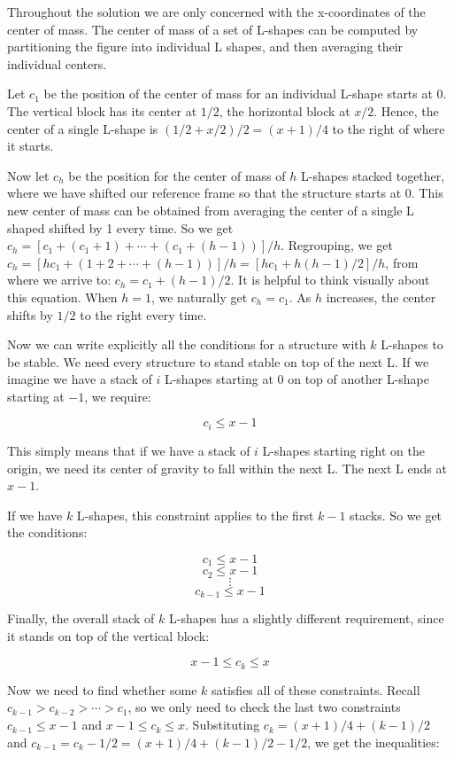 \documentclass[12pt]{article}
\begin{document}
{Throughout the solution we are only concerned with the x-coordinates of the center of mass. The center of mass of a set of L-shapes can be computed by partitioning the figure into individual L shapes, and then averaging their individual centers. 

Let $c_1$ be the position of the center of mass for an individual L-shape starts at $0$. The vertical block has its center at $1/2$, the horizontal block at $x/2$. Hence, the center of a single L-shape is $(1/2 + x/2)/2 = (x + 1)/4$ to the right of where it starts.

Now let $c_h$ be the position for the center of mass of $h$ L-shapes stacked together, where we have shifted our reference frame so that the structure starts at $0$. This new center of mass can be obtained from averaging the center of a single L shaped shifted by 1 every time. So we get $c_h = \left[ c_1 + (c_1 + 1) + \cdots + (c_1 + (h -1))\right] / h$.  Regrouping, we get $c_h  = \left[ hc_1 + (1 + 2 + \cdots + (h-1)) \right] / h = \left[ hc_1 + h(h-1)/ 2 \right] /  h$, from where we arrive to: $c_h = c_1 + (h-1)/2$. 
It is helpful to think visually about this equation. When $h=1$, we naturally get $c_h = c_1$. As $h$ increases, the center shifts by $1/2$ to the right every time.

Now we can write explicitly all the conditions for a structure  with $k$ L-shapes to be stable. We need every structure to stand stable on top of the next L. If we imagine we have a stack of $i$ L-shapes starting at 0 on top of another L-shape starting at $-1$, we require:

$$c_i \leq x - 1$$

This simply means that if we have a stack of $i$ L-shapes starting right on the origin, we need its center of gravity to fall within the next L. The next L ends at $x-1$.

If we have $k$ L-shapes, this constraint applies to the first $k-1$ stacks. So we get the conditions:

$$c_1 \leq x-1$$
$$c_2 \leq x-1$$
$$\vdots$$
$$c_{k-1} \leq x-1$$

Finally, the overall stack of $k$ L-shapes has a slightly different requirement, since it stands on top of the vertical block:

$$x - 1 \leq  c_{k} \leq x$$

Now we need to find whether some $k$ satisfies all of these constraints. Recall $c_{k-1} > c_{k-2} > \cdots > c_{1}$, so we only need to check the last two constraints $c_{k-1} \leq x -1$ and $x - 1 \leq  c_{k} \leq x$. Substituting $c_k = (x+1)/4  + (k - 1)/2$ and $c_{k-1} = c_{k} - 1/2 = (x + 1)/4 + (k-1)/2 - 1/2$, we get the inequalities:

}
\end{document}

